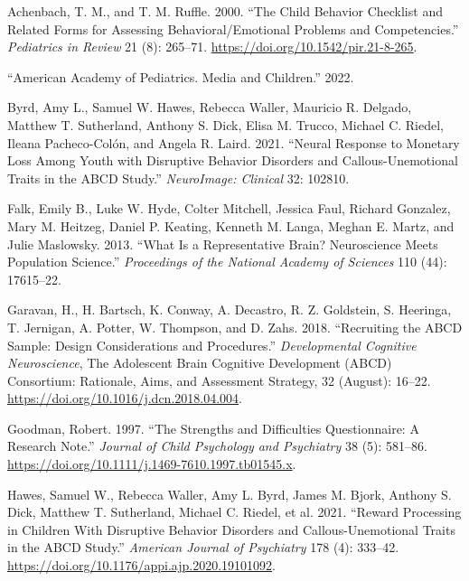 \documentclass{article}
\newlength{\cslhangindent}
\newlength{\cslentryspacingunit} %
\newenvironment{CSLReferences}[2] %
 {%
  \setlength{\parindent}{0pt}
  \ifodd #1
  \let\oldpar\par
  \def\par{\hangindent=\cslhangindent\oldpar}
  \fi
  \setlength{\parskip}{#2\cslentryspacingunit}
 }%
 {}
\begin{document}
\hypertarget{refs}{}
\begin{CSLReferences}{1}{0}
\leavevmode{}%
Achenbach, T. M., and T. M. Ruffle. 2000. {``The {Child Behavior
Checklist} and {Related Forms} for {Assessing Behavioral}/{Emotional
Problems} and {Competencies}.''} \emph{Pediatrics in Review} 21 (8):
265--71. \url{https://doi.org/10.1542/pir.21-8-265}.

\leavevmode{}%
{``American {Academy} of {Pediatrics}. {Media} and Children.''} 2022.

\leavevmode{}%
Byrd, Amy L., Samuel W. Hawes, Rebecca Waller, Mauricio R. Delgado,
Matthew T. Sutherland, Anthony S. Dick, Elisa M. Trucco, Michael C.
Riedel, Ileana Pacheco-Colón, and Angela R. Laird. 2021. {``Neural
Response to Monetary Loss Among Youth with Disruptive Behavior Disorders
and Callous-Unemotional Traits in the {ABCD} Study.''} \emph{NeuroImage:
Clinical} 32: 102810.

\leavevmode{}%
Falk, Emily B., Luke W. Hyde, Colter Mitchell, Jessica Faul, Richard
Gonzalez, Mary M. Heitzeg, Daniel P. Keating, Kenneth M. Langa, Meghan
E. Martz, and Julie Maslowsky. 2013. {``What Is a Representative Brain?
{Neuroscience} Meets Population Science.''} \emph{Proceedings of the
National Academy of Sciences} 110 (44): 17615--22.

\leavevmode{}%
Garavan, H., H. Bartsch, K. Conway, A. Decastro, R. Z. Goldstein, S.
Heeringa, T. Jernigan, A. Potter, W. Thompson, and D. Zahs. 2018.
{``Recruiting the {ABCD} Sample: {Design} Considerations and
Procedures.''} \emph{Developmental Cognitive Neuroscience}, The
{Adolescent Brain Cognitive Development} ({ABCD}) {Consortium}:
{Rationale}, {Aims}, and {Assessment Strategy}, 32 (August): 16--22.
\url{https://doi.org/10.1016/j.dcn.2018.04.004}.

\leavevmode{}%
Goodman, Robert. 1997. {``The {Strengths} and {Difficulties
Questionnaire}: {A Research Note}.''} \emph{Journal of Child Psychology
and Psychiatry} 38 (5): 581--86.
\url{https://doi.org/10.1111/j.1469-7610.1997.tb01545.x}.

\leavevmode{}%
Hawes, Samuel W., Rebecca Waller, Amy L. Byrd, James M. Bjork, Anthony
S. Dick, Matthew T. Sutherland, Michael C. Riedel, et al. 2021.
{``Reward {Processing} in {Children With Disruptive Behavior Disorders}
and {Callous-Unemotional Traits} in the {ABCD Study}.''} \emph{American
Journal of Psychiatry} 178 (4): 333--42.
\url{https://doi.org/10.1176/appi.ajp.2020.19101092}.


\end{CSLReferences}
\end{document}
